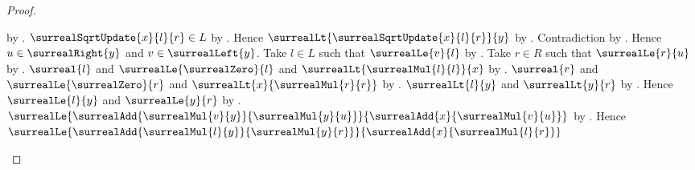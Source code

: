 \begin{proof}
\begin{subproof}
\begin{byCase}
\begin{byCase}
\begin{byCase}
                                by
                                .
                            $\surrealSqrtUpdate{x}{l}{r}\in L$
                                by
                                .
                            Hence $\surrealLt{
                                \surrealSqrtUpdate{x}{l}{r}}{y}$
                                by .
                            Contradiction by
                                .
                            Hence $u\in\surrealRight{y}$ and
                                $v\in\surrealLeft{y}$.
                            Take $l\in L$ such that
                                $\surrealLe{v}{l}$
                                by .
                            Take $r\in R$ such that
                                $\surrealLe{r}{u}$
                                by .
                            $\surreal{l}$ and
                                $\surrealLe{\surrealZero}{l}$ and
                                $\surrealLt{\surrealMul{l}{l}}{x}$
                                by \auto.
                            $\surreal{r}$ and
                                $\surrealLe{\surrealZero}{r}$ and
                                $\surrealLt{x}{\surrealMul{r}{r}}$
                                by \auto.
                            $\surrealLt{l}{y}$ and
                                $\surrealLt{y}{r}$
                                by
                                .
                            Hence $\surrealLe{l}{y}$ and
                                $\surrealLe{y}{r}$
                                by .
                            $\surrealLe{
                                \surrealAdd{\surrealMul{v}{y}}{
                                    \surrealMul{y}{u}}}{
                                \surrealAdd{x}{\surrealMul{v}{u}}}$
                                by
                                .
                            Hence $\surrealLe{
                                \surrealAdd{\surrealMul{l}{y}}{
                                    \surrealMul{y}{r}}}{
                                \surrealAdd{x}{\surrealMul{l}{r}}}$

\end{byCase}
\end{byCase}
\end{byCase}
\end{subproof}
\end{proof}
